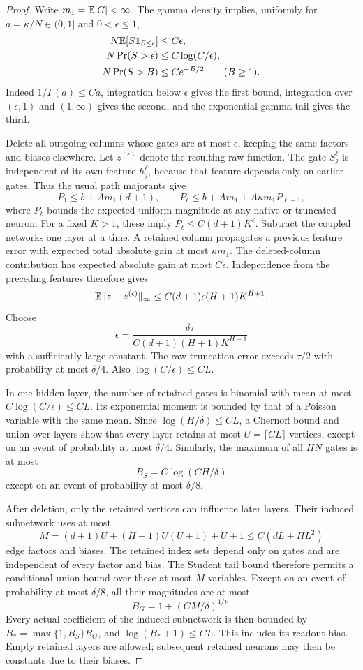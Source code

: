 \begin{proof}
Write $m_1=\mathbb E|G|<\infty$. The gamma density implies, uniformly for $a=\kappa/N\in(0,1]$ and $0<\epsilon\le1$,
\begin{align*}
 N\mathbb E[S\mathbf1_{S\le\epsilon}]&\le C\epsilon,\\
 N\Pr(S>\epsilon)&\le C\log(C/\epsilon),\\
 N\Pr(S>B)&\le C e^{-B/2}\qquad(B\ge1).
\end{align*}
Indeed $1/\Gamma(a)\le Ca$, integration below $\epsilon$ gives the first bound, integration over $(\epsilon,1)$ and $(1,\infty)$ gives the second, and the exponential gamma tail gives the third.

Delete all outgoing columns whose gates are at most $\epsilon$, keeping the same factors and biases elsewhere. Let $z^{(\epsilon)}$ denote the resulting raw function. The gate $S_j^\ell$ is independent of its own feature $h_j^\ell$, because that feature depends only on earlier gates. Thus the usual path majorants give
\[
 P_1\le b+A m_1(d+1),\qquad
 P_\ell\le b+A m_1+A\kappa m_1P_{\ell-1},
\]
where $P_\ell$ bounds the expected uniform magnitude at any native or truncated neuron. For a fixed $K>1$, these imply $P_\ell\le C(d+1)K^\ell$. Subtract the coupled networks one layer at a time. A retained column propagates a previous feature error with expected total absolute gain at most $\kappa m_1$. The deleted-column contribution has expected absolute gain at most $C\epsilon$. Independence from the preceding features therefore gives
\[
 \mathbb E\|z-z^{(\epsilon)}\|_\infty
 \le C(d+1)\epsilon(H+1)K^{H+1}.
\]
Choose
\[
 \epsilon=\frac{\delta\tau}{C(d+1)(H+1)K^{H+1}}
\]
with a sufficiently large constant. The raw truncation error exceeds $\tau/2$ with probability at most $\delta/4$. Also $\log(C/\epsilon)\le CL$.

In one hidden layer, the number of retained gates is binomial with mean at most $C\log(C/\epsilon)\le CL$. Its exponential moment is bounded by that of a Poisson variable with the same mean. Since $\log(H/\delta)\le CL$, a Chernoff bound and union over layers show that every layer retains at most $U=\lceil CL\rceil$ vertices, except on an event of probability at most $\delta/4$. Similarly, the maximum of all $HN$ gates is at most
\[
 B_S=C\log(CH/\delta)
\]
except on an event of probability at most $\delta/8$.

After deletion, only the retained vertices can influence later layers. Their induced subnetwork uses at most
\[
 M=(d+1)U+(H-1)U(U+1)+U+1
       \le C(dL+HL^2)
\]
edge factors and biases. The retained index sets depend only on gates and are independent of every factor and bias. The Student tail bound therefore permits a conditional union bound over these at most $M$ variables. Except on an event of probability at most $\delta/8$, all their magnitudes are at most
\[
 B_G=1+(CM/\delta)^{1/\nu}.
\]
Every actual coefficient of the induced subnetwork is then bounded by $B_*=\max\{1,B_S\}B_G$, and $\log(B_*+1)\le CL$. This includes its readout bias. Empty retained layers are allowed; subsequent retained neurons may then be constants due to their biases.


\end{proof}
